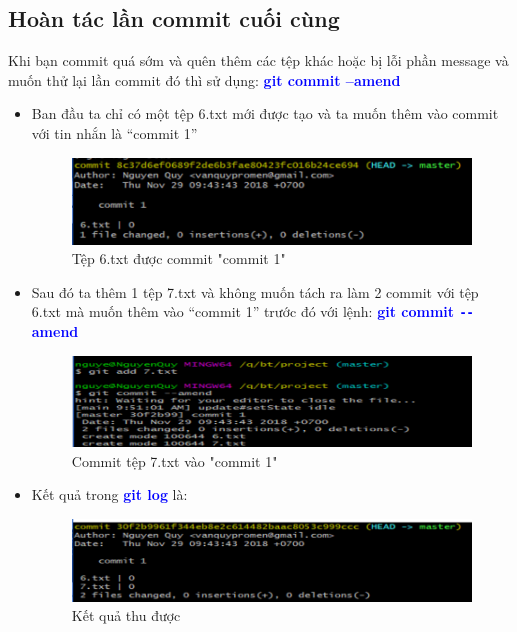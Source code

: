 \documentclass[12pt,a4paper]{report}
\begin{document}
\subsection{Hoàn tác lần commit cuối cùng}
Khi bạn commit quá sớm và quên thêm các tệp khác hoặc bị lỗi phần message và muốn thử lại lần commit đó thì sử dụng: \textcolor{blue}{\bf git commit –amend}
\begin{itemize}
\item Ban đầu ta chỉ có một tệp 6.txt mới được tạo và ta muốn thêm vào commit với tin nhắn là “commit 1”

\begin{figure}[!ht]
	\centering
	\includegraphics[width=0.8\linewidth]{screenshot026}
\caption{Tệp 6.txt được commit "commit 1"}
	\label{fig:screenshot026}
\end{figure}

\item Sau đó ta thêm 1 tệp 7.txt và không muốn tách ra làm 2 commit với tệp 6.txt mà muốn thêm vào “commit 1” trước đó với lệnh: \textcolor{blue}{\bf git commit \texttt{-{}-}amend}

\begin{figure}[!ht]
	\centering
	\includegraphics[width=0.8\linewidth]{screenshot027}
\caption{Commit tệp 7.txt vào "commit 1"}
	\label{fig:screenshot027}
	\end{figure}

\item Kết quả trong \textcolor{blue}{\bf git log} là:

\begin{figure}[!ht]
	\centering
	\includegraphics[width=0.8\linewidth]{screenshot028}
	\caption{Kết quả thu được}
	\label{fig:screenshot028}
	\end{figure}
\end{itemize}
\end{document}
